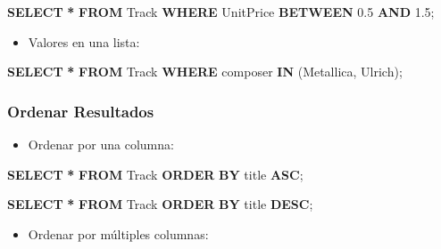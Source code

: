 \documentclass[
]{book}
\newenvironment{Shaded}{\begin{snugshade}}{\end{snugshade}}
\newcommand{\FloatTok}[1]{\textcolor[rgb]{0.00,0.00,0.81}{#1}}
\newcommand{\KeywordTok}[1]{\textcolor[rgb]{0.13,0.29,0.53}{\textbf{#1}}}
\newcommand{\NormalTok}[1]{#1}
\newcommand{\OperatorTok}[1]{\textcolor[rgb]{0.81,0.36,0.00}{\textbf{#1}}}
\newcommand{\StringTok}[1]{\textcolor[rgb]{0.31,0.60,0.02}{#1}}
\providecommand{\tightlist}{%
  \setlength{\itemsep}{0pt}\setlength{\parskip}{0pt}}
\begin{document}
\begin{Shaded}
\begin{Highlighting}[]
  \KeywordTok{SELECT} \OperatorTok{*} \KeywordTok{FROM}\NormalTok{ Track}
  \KeywordTok{WHERE}\NormalTok{ UnitPrice }\KeywordTok{BETWEEN} \FloatTok{0.5} \KeywordTok{AND} \FloatTok{1.5}\NormalTok{; }
\end{Highlighting}
\end{Shaded}

\begin{itemize}
\tightlist
\item
  Valores en una lista:
\end{itemize}

\begin{Shaded}
\begin{Highlighting}[]
  \KeywordTok{SELECT} \OperatorTok{*} \KeywordTok{FROM}\NormalTok{ Track}
  \KeywordTok{WHERE}\NormalTok{ composer }\KeywordTok{IN}\NormalTok{ (}\StringTok{\textquotesingle{}Metallica\textquotesingle{}}\NormalTok{, }\StringTok{\textquotesingle{}Ulrich\textquotesingle{}}\NormalTok{); }
\end{Highlighting}
\end{Shaded}

\subsubsection{Ordenar Resultados}\label{ordenar-resultados}

\begin{itemize}
\tightlist
\item
  Ordenar por una columna:
\end{itemize}

\begin{Shaded}
\begin{Highlighting}[]
  \KeywordTok{SELECT} \OperatorTok{*} \KeywordTok{FROM}\NormalTok{ Track}
  \KeywordTok{ORDER} \KeywordTok{BY}\NormalTok{ title }\KeywordTok{ASC}\NormalTok{; }

  \KeywordTok{SELECT} \OperatorTok{*} \KeywordTok{FROM}\NormalTok{ Track}
  \KeywordTok{ORDER} \KeywordTok{BY}\NormalTok{ title }\KeywordTok{DESC}\NormalTok{; }
\end{Highlighting}
\end{Shaded}

\begin{itemize}
\tightlist
\item
  Ordenar por múltiples columnas:
\end{itemize}
\end{document}
